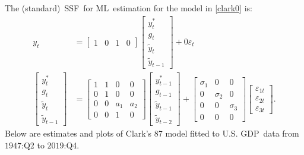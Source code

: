 \documentclass[a4paper,final,12pt]{article}
\begin{document}
The (standard)\ SSF\ for ML\ estimation for the model in \ref{clark0} is:%
\begin{align}
y_{t}& =%
\begin{bmatrix}
1 & 0 & 1 & 0%
\end{bmatrix}%
\begin{bmatrix}
y_{t}^{\ast } \\ 
g_{t} \\ 
\tilde{y}_{t} \\ 
\tilde{y}_{t-1}%
\end{bmatrix}%
+0\varepsilon _{t} \\[4mm]
\begin{bmatrix}
y_{t}^{\ast } \\ 
g_{t} \\ 
\tilde{y}_{t} \\ 
\tilde{y}_{t-1}%
\end{bmatrix}%
& =%
\begin{bmatrix}
1 & 1 & 0 & 0 \\ 
0 & 1 & 0 & 0 \\ 
0 & 0 & a_{1} & a_{2} \\ 
0 & 0 & 1 & 0%
\end{bmatrix}%
\begin{bmatrix}
y_{t-1}^{\ast } \\ 
g_{t-1} \\ 
\tilde{y}_{t-1} \\ 
\tilde{y}_{t-2}%
\end{bmatrix}%
+%
\begin{bmatrix}
\sigma _{1} & 0 & 0 \\ 
0 & \sigma _{2} & 0 \\ 
0 & 0 & \sigma _{3} \\ 
0 & 0 & 0%
\end{bmatrix}%
\begin{bmatrix}
\varepsilon _{1t} \\ 
\varepsilon _{2t} \\ 
\varepsilon _{3t}%
\end{bmatrix}%
.
\end{align}%
Below are estimates and plots of Clark's 87 model fitted to U.S. GDP\ data
from $1947$:Q2 to $2019$:Q4. 
\end{document}
